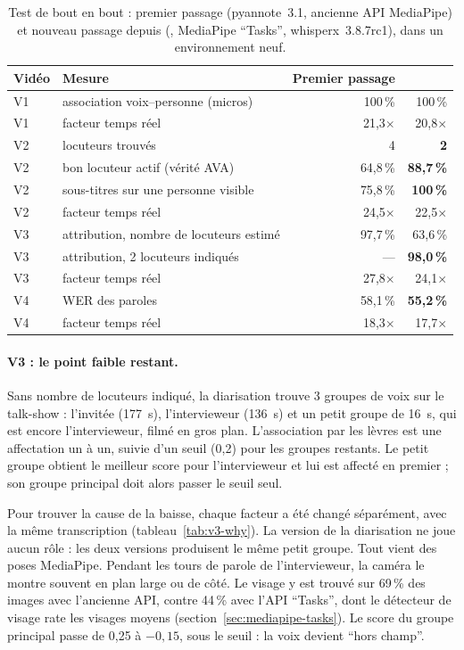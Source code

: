 \documentclass[11pt,a4paper]{report}
\newcommand{\code}[1]{\texttt{\detokenize{#1}}}
\begin{document}
\begin{table}[H]
\centering
\caption{Test de bout en bout : premier passage (pyannote~3.1, ancienne API MediaPipe) et nouveau passage depuis
\code{dev} (\code{community-1}, MediaPipe \enquote{Tasks}, whisperx~3.8.7rc1), dans un environnement neuf.}
\label{tab:dev-run}
\small
\begin{tabular}{@{}llrr@{}}
\toprule
Vidéo & Mesure & Premier passage & \code{dev} \\
\midrule
V1 & association voix--personne (micros) & 100\,\% & 100\,\% \\
V1 & facteur temps réel & 21,3$\times$ & 20,8$\times$ \\
V2 & locuteurs trouvés & 4 & \textbf{2} \\
V2 & bon locuteur actif (vérité AVA) & 64,8\,\% & \textbf{88,7\,\%} \\
V2 & sous-titres sur une personne visible & 75,8\,\% & \textbf{100\,\%} \\
V2 & facteur temps réel & 24,5$\times$ & 22,5$\times$ \\
V3 & attribution, nombre de locuteurs estimé & 97,7\,\% & 63,6\,\% \\
V3 & attribution, 2 locuteurs indiqués & --- & \textbf{98,0\,\%} \\
V3 & facteur temps réel & 27,8$\times$ & 24,1$\times$ \\
V4 & WER des paroles & 58,1\,\% & \textbf{55,2\,\%} \\
V4 & facteur temps réel & 18,3$\times$ & 17,7$\times$ \\
\bottomrule
\end{tabular}
\end{table}

\paragraph{V3 : le point faible restant.} Sans nombre de locuteurs indiqué, la diarisation trouve 3 groupes de voix
sur le talk-show : l'invitée (177~s), l'intervieweur (136~s) et un petit groupe de 16~s, qui est encore l'intervieweur,
filmé en gros plan. L'association par les lèvres est une affectation un à un, suivie d'un seuil (0,2) pour les groupes
restants. Le petit groupe obtient le meilleur score pour l'intervieweur et lui est affecté en premier ; son groupe
principal doit alors passer le seuil seul.

Pour trouver la cause de la baisse, chaque facteur a été changé séparément, avec la même transcription
(tableau~\ref{tab:v3-why}). La version de la diarisation ne joue aucun rôle : les deux versions produisent le même petit
groupe. Tout vient des poses MediaPipe. Pendant les tours de parole de l'intervieweur, la caméra le montre souvent en
plan large ou de côté. Le visage y est trouvé sur 69\,\% des images avec l'ancienne API, contre 44\,\% avec l'API
\enquote{Tasks}, dont le détecteur de visage rate les visages moyens (section~\ref{sec:mediapipe-tasks}). Le score du
groupe principal passe de 0,25 à $-0{,}15$, sous le seuil : la voix devient \enquote{hors champ}.
\end{document}
